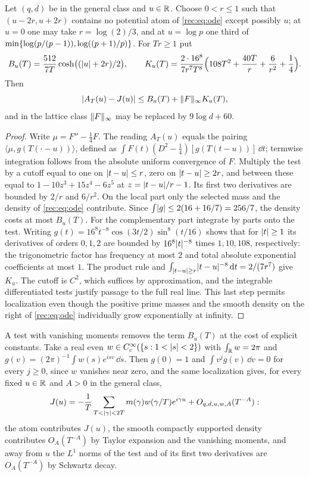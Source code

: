 \begin{proposition}\label{rec:prop:band}
Let $(q,d)$ be in the general class and $u\in\mathbb{R}$. Choose $0<r\le1$ such that $(u-2r,u+2r)$
contains no potential atom of \eqref{rec:eq:ode} except possibly $u$; at $u=0$ one may take
$r=\log(2)/3$, and at $u=\log p$ one third of
$\min\{\log(p/(p-1)),\log((p+1)/p)\}$. For $Tr\ge1$ put
\[
 B_u(T)=\frac{512}{7T}\cosh\bigl((\lvert u\rvert+2r)/2\bigr),\qquad
 K_u(T)=\frac{2\cdot16^8}{7r^7T^8}\Bigl(108T^2+\frac{40T}r+\frac6{r^2}+\frac14\Bigr).
\]
Then
\begin{equation}\label{rec:eq:error}
 \lvert A_T(u)-J(u)\rvert\le B_u(T)+\lVert F\rVert_\infty K_u(T),
\end{equation}
and in the lattice class $\lVert F\rVert_\infty$ may be replaced by $9\log d+60$.
\end{proposition}
\begin{proof}
Write $\mu=F''-\tfrac14F$. The reading $A_T(u)$ equals the pairing
$\langle\mu,g(T(\cdot-u))\rangle$, defined as
$\int F(t)(D^2-\tfrac14)[g(T(t-u))]\,\dd t$; termwise integration follows from the absolute
uniform convergence of $F$. Multiply the test by a cutoff equal to one on $\lvert t-u\rvert\le r$,
zero on $\lvert t-u\rvert\ge2r$, and between these equal to $1-10z^3+15z^4-6z^5$ at
$z=\lvert t-u\rvert/r-1$. Its first two derivatives are bounded by $2/r$ and $6/r^2$. On the local
part only the selected mass and the density of \eqref{rec:eq:ode} contribute. Since
$\int\lvert g\rvert\le2(16+16/7)=256/7$, the density costs at most $B_u(T)$. For the complementary
part integrate by parts onto the test. Writing $g(t)=16^8t^{-8}\cos(3t/2)\sin^8(t/16)$ shows
that for $\lvert t\rvert\ge1$ its derivatives of orders $0,1,2$ are bounded by $16^8\lvert t\rvert^{-8}$
times $1,10,108$, respectively: the trigonometric factor has frequency at most $2$ and total
absolute exponential coefficients at most $1$. The product rule and
$\int_{\lvert t-u\rvert\ge r}\lvert t-u\rvert^{-8}\,\mathrm{d} t=2/(7r^7)$ give $K_u$. The cutoff is $C^2$, which
suffices by approximation, and the integrable differentiated tests justify passage to the
full real line. This last step permits localization even though the positive prime masses
and the smooth density on the right of \eqref{rec:eq:ode} individually grow exponentially at
infinity.
\end{proof}

\begin{remark}\label{rec:rem:fastband}
A test with vanishing moments removes the term $B_u(T)$ at the cost of explicit constants.
Take a real even $w\in C_c^\infty(\{s:1<\lvert s\rvert<2\})$ with $\int_{\mathbb{R}} w=2\pi$ and
$g(v)=(2\pi)^{-1}\int w(s)e^{isv}\,\dd s$. Then $g(0)=1$ and $\int v^jg(v)\,\dd v=0$ for
every $j\ge0$, since $w$ vanishes near zero, and the same localization gives, for every
fixed $u\in\mathbb{R}$ and $A>0$ in the general class,
\[
 J(u)=-\frac1T\sum_{T<\lvert\gamma\rvert<2T}m(\gamma)w(\gamma/T)e^{i\gamma u}+O_{q,d,u,w,A}(T^{-A}):
\]
the atom contributes $J(u)$, the smooth compactly supported density contributes
$O_A(T^{-A})$ by Taylor expansion and the vanishing moments, and away from $u$ the $L^1$
norms of the test and of its first two derivatives are $O_A(T^{-A})$ by Schwartz decay.
\end{remark}


